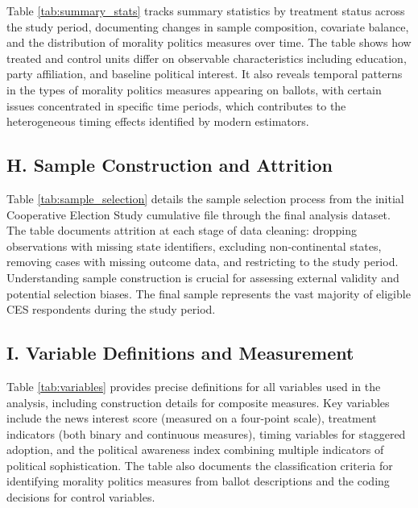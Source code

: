 \documentclass[12pt,letterpaper,oneside]{book}
\newcommand{\basepath}{g:/My Drive/Grad School}
\newcommand{\basepath}{basepath}
\begin{document}
Table \ref{tab:summary_stats} tracks summary statistics by treatment status across the study period, documenting changes in sample composition, covariate balance, and the distribution of morality politics measures over time. The table shows how treated and control units differ on observable characteristics including education, party affiliation, and baseline political interest. It also reveals temporal patterns in the types of morality politics measures appearing on ballots, with certain issues concentrated in specific time periods, which contributes to the heterogeneous timing effects identified by modern estimators.



\subsection*{H. Sample Construction and Attrition}

Table \ref{tab:sample_selection} details the sample selection process from the initial Cooperative Election Study cumulative file through the final analysis dataset. The table documents attrition at each stage of data cleaning: dropping observations with missing state identifiers, excluding non-continental states, removing cases with missing outcome data, and restricting to the study period. Understanding sample construction is crucial for assessing external validity and potential selection biases. The final sample represents the vast majority of eligible CES respondents during the study period.


\label{tab:sample_selection}

\subsection*{I. Variable Definitions and Measurement}

Table \ref{tab:variables} provides precise definitions for all variables used in the analysis, including construction details for composite measures. Key variables include the news interest score (measured on a four-point scale), treatment indicators (both binary and continuous measures), timing variables for staggered adoption, and the political awareness index combining multiple indicators of political sophistication. The table also documents the classification criteria for identifying morality politics measures from ballot descriptions and the coding decisions for control variables.
\end{document}
